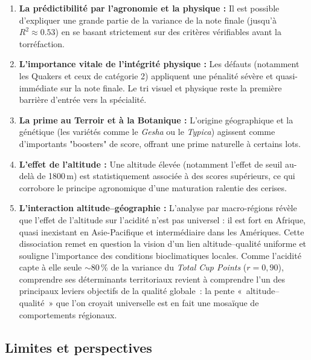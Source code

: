 \documentclass[12pt,a4paper]{article}
\begin{document}
\begin{enumerate}
  \item \textbf{La prédictibilité par l'agronomie et la physique :} Il est possible d'expliquer une grande partie de la variance de la note finale (jusqu'à $R^2 \approx 0.53$) en se basant strictement sur des critères vérifiables avant la torréfaction. 
  \item \textbf{L'importance vitale de l'intégrité physique :} Les défauts (notamment les Quakers et ceux de catégorie 2) appliquent une pénalité sévère et quasi-immédiate sur la note finale. Le tri visuel et physique reste la première barrière d'entrée vers la spécialité.
  \item \textbf{La prime au Terroir et à la Botanique :} L'origine géographique et la génétique (les variétés comme le \textit{Gesha} ou le \textit{Typica}) agissent comme d'importants "boosters" de score, offrant une prime naturelle à certains lots.
  \item \textbf{L'effet de l'altitude :} Une altitude élevée (notamment l'effet de seuil au-delà de 1800\,m) est statistiquement associée à des scores supérieurs, ce qui corrobore le principe agronomique d'une maturation ralentie des cerises.
  \item \textbf{L'interaction altitude--géographie :} L'analyse par macro-régions révèle que l'effet de l'altitude sur l'acidité n'est pas universel : il est fort en Afrique, quasi inexistant en Asie-Pacifique et intermédiaire dans les Amériques. Cette dissociation remet en question la vision d'un lien altitude--qualité uniforme et souligne l'importance des conditions bioclimatiques locales. Comme l'acidité capte à elle seule $\sim$80\,\% de la variance du \textit{Total Cup Points} ($r = 0{,}90$), comprendre ses déterminants territoriaux revient à comprendre l'un des principaux leviers objectifs de la qualité globale~: la pente «~altitude--qualité~» que l'on croyait universelle est en fait une mosaïque de comportements régionaux.
\end{enumerate}

\subsection{Limites et perspectives}
\end{document}
